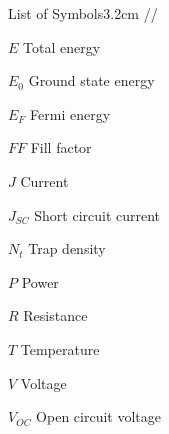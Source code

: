 \begin{mclistof}{List of Symbols}{3.2cm}
//

\item[$E$] Total energy
\item[$E_0$] Ground state energy
\item[$E_F$] Fermi energy
\item[$FF$] Fill factor
\item[$J$] Current
\item[$J_{SC}$] Short circuit current
\item[$N_t$] Trap density
\item[$P$] Power
\item[$R$] Resistance
\item[$T$] Temperature
\item[$V$] Voltage
\item[$V_{OC}$] Open circuit voltage


\end{mclistof} 